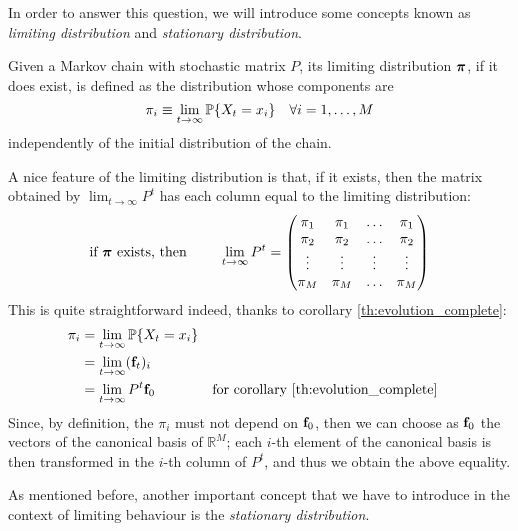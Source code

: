 \smallskip
In order to answer this question, we will introduce some concepts known as \emph{limiting distribution} and \emph{stationary distribution}.

\begin{ndef}
Given a Markov chain with stochastic matrix $P$, its limiting distribution $\boldsymbol{\pi}$, if it does exist, is defined as the distribution whose components are
\begin{equation}
    \pi_i \equiv \lim_{t \rightarrow \infty} \mathbb{P}\{X_t = x_i\} \quad \forall i=1,\dots,M
\end{equation}
independently of the initial distribution of the chain.
\end{ndef}

A nice feature of the limiting distribution is that, if it exists, then the matrix obtained by $\lim_{t \rightarrow \infty} P^t$ has each column equal to the limiting distribution:
\begin{equation}
    \text{if $\boldsymbol{\pi}$ exists, then } \quad \quad \lim_{t \rightarrow \infty} P^t = 
    \begin{pmatrix}
        \pi_1 & \pi_1 & \dots & \pi_1 \\
        \pi_2 & \pi_2 & \dots & \pi_2 \\
        \vdots & \vdots & \vdots & \vdots \\
        \pi_M & \pi_M & \dots & \pi_M
    \end{pmatrix}
\end{equation}
This is quite straightforward indeed, thanks to corollary \ref{th:evolution_complete}:
\begin{align}
    \pi_i
        & = \lim_{t \rightarrow \infty} \mathbb{P}\{X_t = x_i\} \\
        & = \lim_{t \rightarrow \infty} (\mathbf{f}_t)_i \\
        & = \lim_{t \rightarrow \infty} P^t \mathbf{f}_0 && \text{for corollary \ref{th:evolution_complete}}
\end{align}
Since, by definition, the $\pi_i$ must not depend on $\mathbf{f}_0$, then we can choose as $\mathbf{f}_0$ the vectors of the canonical basis of $\mathbb{R}^M$; each $i$-th element of the canonical basis is then transformed in the $i$-th column of $P^t$, and thus we obtain the above equality. 

\medskip
As mentioned before, another important concept that we have to introduce in the context of limiting behaviour is the \emph{stationary distribution}.

